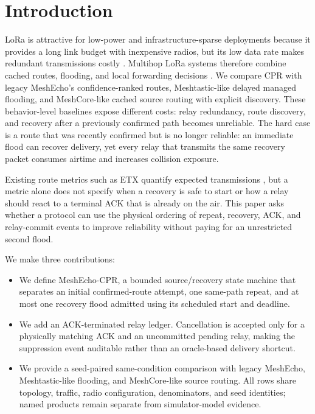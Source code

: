 \documentclass[conference,letterpaper,10pt]{IEEEtran}
\begin{document}
\section{Introduction}
LoRa is attractive for low-power and infrastructure-sparse deployments because
it provides a long link budget with inexpensive radios, but its low data rate
makes redundant transmissions costly
\cite{augustin2016study,bor2016scale,georgiou2017scale}. Multihop LoRa
systems therefore combine cached routes, flooding, and local forwarding
decisions \cite{wong2024multihop,cotrim2020lorawanmesh}.
We compare CPR with legacy MeshEcho's confidence-ranked routes,
Meshtastic-like delayed managed flooding, and MeshCore-like cached source
routing with explicit discovery. These behavior-level baselines expose
different costs: relay redundancy, route discovery, and recovery after a
previously confirmed path becomes unreliable.
The hard case is a route that was recently confirmed but is no longer reliable:
an immediate flood can recover delivery, yet every relay that transmits the
same recovery packet consumes airtime and increases collision exposure.

Existing route metrics such as ETX quantify expected transmissions
\cite{decouto2003etx}, but a metric alone does not specify when a recovery is
safe to start or how a relay should react to a terminal ACK that is already on
the air. This paper asks whether a protocol can use the physical ordering of
repeat, recovery, ACK, and relay-commit events to improve reliability without
paying for an unrestricted second flood.

We make three contributions:
\begin{itemize}
\item We define MeshEcho-CPR, a bounded source/recovery state machine that
  separates an initial confirmed-route attempt, one same-path repeat, and at
  most one recovery flood admitted using its scheduled start and deadline.
\item We add an ACK-terminated relay ledger. Cancellation is accepted only for
  a physically matching ACK and an uncommitted pending relay, making the
  suppression event auditable rather than an oracle-based delivery shortcut.
\item We provide a seed-paired same-condition
  comparison with legacy MeshEcho,
  Meshtastic-like flooding, and MeshCore-like source routing. All rows share
  topology, traffic, radio configuration, denominators, and seed identities;
  named products remain separate from simulator-model evidence.
\end{itemize}
\end{document}
